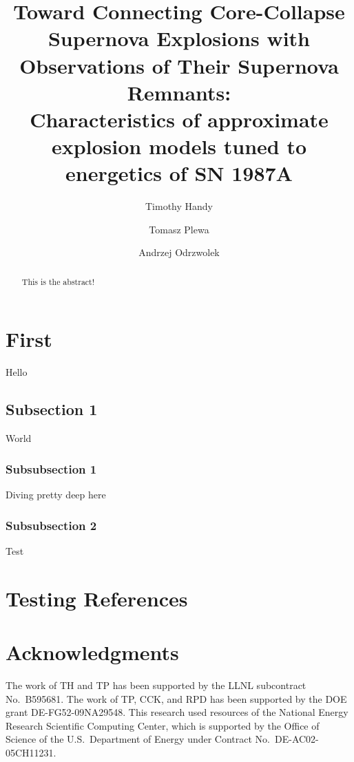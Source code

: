 \documentclass[iop]{emulateapj}
\begin{document}
%
\title{Toward Connecting Core-Collapse Supernova Explosions with Observations of Their Supernova Remnants: \\
Characteristics of approximate explosion models tuned to energetics of SN 1987A}
%
\author{Timothy Handy}
%
\author{Tomasz Plewa}
%
\author{Andrzej Odrzwolek}
%
%
%
%
\begin{abstract}
This is the abstract!
\end{abstract}
%
%
%
%
%
%

\section{First}
Hello
\subsection{Subsection 1}
World
\subsubsection{Subsubsection 1}
Diving pretty deep here
\subsubsection{Subsubsection 2}
Test

\section{Testing References}

\cite{kifonidis+03}

\citep{kifonidis+06}

\citet{kifonidis+06}

\cite{kifonidis+03,kifonidis+06}

\citep{kifonidis+03,kifonidis+06}

\citet{kifonidis+03,kifonidis+06}

%
%
%
\section{Acknowledgments}\label{s:ack}
%
%
%
The work of TH and TP has been supported by the LLNL subcontract
No.\ B595681. The work of TP, CCK, and RPD has been supported by the
DOE grant DE-FG52-09NA29548. This research used resources of the
National Energy Research Scientific Computing Center, which is
supported by the Office of Science of the U.S.\ Department of Energy
under Contract No.\ DE-AC02-05CH11231.
%
%
%


%
%
%
\end{document}
